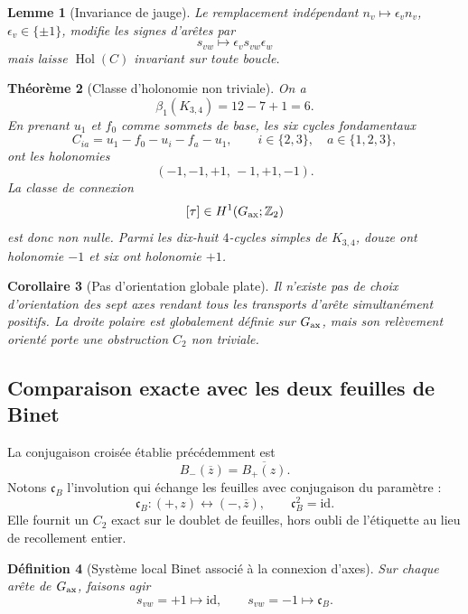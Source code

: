 \documentclass[11pt,a4paper]{article}
\newtheorem{theorem}{Théorème}[section]
\newtheorem{lemma}[theorem]{Lemme}
\newtheorem{corollary}[theorem]{Corollaire}
\newtheorem{definition}[theorem]{Définition}
\newcommand{\Z}{\mathbb Z}
\begin{document}
\begin{lemma}[Invariance de jauge]\label{lem:v14-gauge}
Le remplacement indépendant $n_v\mapsto\epsilon_vn_v$, $\epsilon_v\in\{\pm1\}$, modifie les signes d'arêtes par
\[
 s_{vw}\mapsto\epsilon_vs_{vw}\epsilon_w
\]
mais laisse $\operatorname{Hol}(C)$ invariant sur toute boucle.
\end{lemma}

\begin{theorem}[Classe d'holonomie non triviale]\label{thm:v14-holonomy-class}
On a
\[
 \beta_1(K_{3,4})=12-7+1=6.
\]
En prenant $u_1$ et $f_0$ comme sommets de base, les six cycles fondamentaux
\[
 C_{ia}=u_1-f_0-u_i-f_a-u_1,
 \qquad
 i\in\{2,3\},\quad a\in\{1,2,3\},
\]
ont les holonomies
\begin{equation}\label{eq:v14-fund-hol}
 \boxed{
 (-1,-1,+1,\,-1,+1,-1).}
\end{equation}
La classe de connexion
\[
 [\tau]\in H^1(G_{\rm ax};\Z_2)
\]
est donc non nulle. Parmi les dix-huit $4$-cycles simples de $K_{3,4}$, douze ont holonomie $-1$ et six ont holonomie $+1$.
\end{theorem}

\begin{corollary}[Pas d'orientation globale plate]\label{cor:v14-no-global-orient}
Il n'existe pas de choix d'orientation des sept axes rendant tous les transports d'arête simultanément positifs. La droite polaire est globalement définie sur $G_{\rm ax}$, mais son relèvement orienté porte une obstruction $C_2$ non triviale.
\end{corollary}

\subsection{Comparaison exacte avec les deux feuilles de Binet}

La conjugaison croisée établie précédemment est
\[
 B_-(\overline z)=\overline{B_+(z)}.
\]
Notons $\mathfrak c_B$ l'involution qui échange les feuilles avec conjugaison du paramètre :
\begin{equation}\label{eq:v14-Binet-deck}
 \mathfrak c_B:(+,z)\longleftrightarrow(-,\overline z),
 \qquad
 \mathfrak c_B^2=\mathrm{id}.
\end{equation}
Elle fournit un $C_2$ exact sur le doublet de feuilles, hors oubli de l'étiquette au lieu de recollement entier.

\begin{definition}[Système local Binet associé à la connexion d'axes]\label{def:v14-Binet-local-system}
Sur chaque arête de $G_{\rm ax}$, faisons agir
\[
 s_{vw}=+1\mapsto\mathrm{id},
 \qquad
 s_{vw}=-1\mapsto\mathfrak c_B.
\]
\end{definition}
\end{document}
